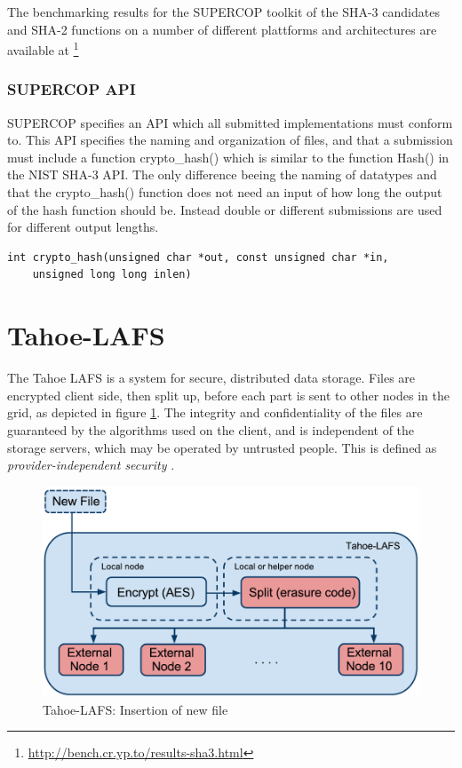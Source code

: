\documentclass[english,12pt,a4paper]{book}
\begin{document}
The benchmarking results for the \ac{SUPERCOP} toolkit of the \ac{SHA}-3
candidates and \ac{SHA}-2 functions on a number of different plattforms and
architectures are available at
\footnote{\url{http://bench.cr.yp.to/results-sha3.html}}

\subsubsection{\ac{SUPERCOP} \ac{API}}
\ac{SUPERCOP} specifies an \ac{API} which all submitted implementations must
conform to\cite{s_supercopapi}. This \ac{API} specifies the naming and
organization of files, and that a submission must include a function
crypto\_hash() which is similar to the function Hash() in the \ac{NIST} \ac{SHA}-3
\ac{API}. The only difference beeing the naming of datatypes and that the
crypto\_hash() function does not need an input of how long the output of the
hash function should be. Instead double or different submissions are used for
different output lengths.

\begin{verbatim}
int crypto_hash(unsigned char *out, const unsigned char *in,
    unsigned long long inlen)
\end{verbatim}

\section{Tahoe-LAFS}

The Tahoe \ac{LAFS} is a system for secure,
distributed data storage. Files are encrypted client side, then
split up, before each part is sent to other nodes in the grid, as depicted in
figure \ref{fig:tahoeinsertion}. The integrity and confidentiality of the files
are guaranteed by the algorithms used on the client, and is independent of the
storage servers, which may be operated by untrusted people. This is defined as
\emph{provider-independent security} \cite{t_tahoe}.

\begin{figure}[h!]
    \centering
    \includegraphics[width=0.9\columnwidth]{Tahoe-newfile.pdf}
    \caption{Tahoe-LAFS: Insertion of new file}
    \label{fig:tahoeinsertion}
\end{figure}
\end{document}
